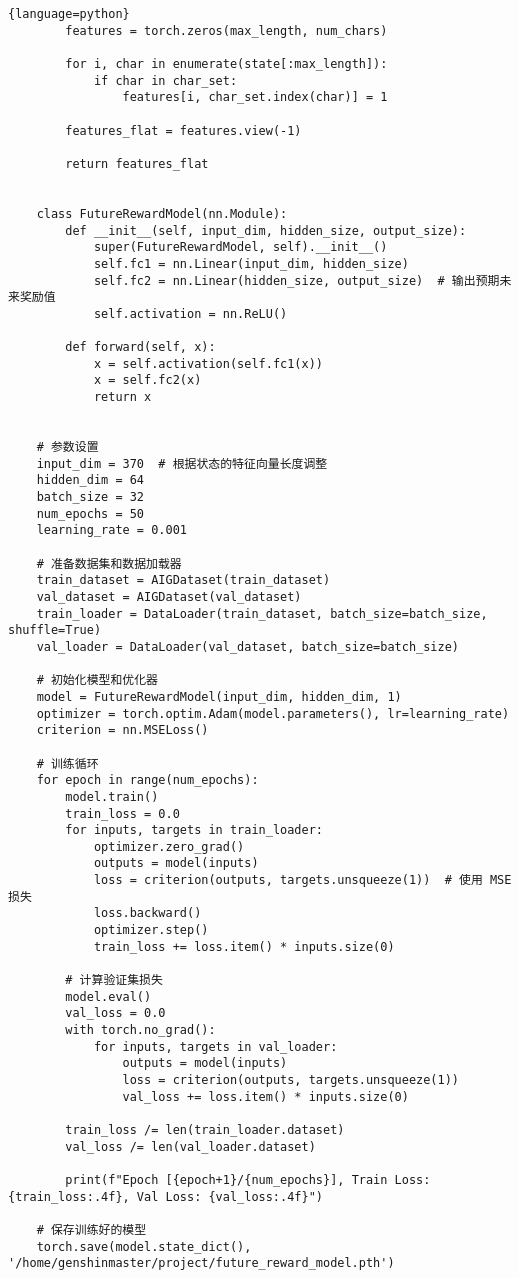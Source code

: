 \documentclass[UTF8]{ctexart}
\begin{document}
\begin{lstlisting}{language=python}
        features = torch.zeros(max_length, num_chars)
    
        for i, char in enumerate(state[:max_length]):
            if char in char_set:
                features[i, char_set.index(char)] = 1
    
        features_flat = features.view(-1)
    
        return features_flat
    
    
    class FutureRewardModel(nn.Module):
        def __init__(self, input_dim, hidden_size, output_size):
            super(FutureRewardModel, self).__init__()
            self.fc1 = nn.Linear(input_dim, hidden_size)
            self.fc2 = nn.Linear(hidden_size, output_size)  # 输出预期未来奖励值
            self.activation = nn.ReLU()
    
        def forward(self, x):
            x = self.activation(self.fc1(x))
            x = self.fc2(x)
            return x
    
    
    # 参数设置
    input_dim = 370  # 根据状态的特征向量长度调整
    hidden_dim = 64
    batch_size = 32
    num_epochs = 50
    learning_rate = 0.001
    
    # 准备数据集和数据加载器
    train_dataset = AIGDataset(train_dataset)
    val_dataset = AIGDataset(val_dataset)
    train_loader = DataLoader(train_dataset, batch_size=batch_size, shuffle=True)
    val_loader = DataLoader(val_dataset, batch_size=batch_size)
    
    # 初始化模型和优化器
    model = FutureRewardModel(input_dim, hidden_dim, 1)
    optimizer = torch.optim.Adam(model.parameters(), lr=learning_rate)
    criterion = nn.MSELoss()
    
    # 训练循环
    for epoch in range(num_epochs):
        model.train()
        train_loss = 0.0
        for inputs, targets in train_loader:
            optimizer.zero_grad()
            outputs = model(inputs)
            loss = criterion(outputs, targets.unsqueeze(1))  # 使用 MSE 损失
            loss.backward()
            optimizer.step()
            train_loss += loss.item() * inputs.size(0)
        
        # 计算验证集损失
        model.eval()
        val_loss = 0.0
        with torch.no_grad():
            for inputs, targets in val_loader:
                outputs = model(inputs)
                loss = criterion(outputs, targets.unsqueeze(1))
                val_loss += loss.item() * inputs.size(0)
        
        train_loss /= len(train_loader.dataset)
        val_loss /= len(val_loader.dataset)
        
        print(f"Epoch [{epoch+1}/{num_epochs}], Train Loss: {train_loss:.4f}, Val Loss: {val_loss:.4f}")
    
    # 保存训练好的模型
    torch.save(model.state_dict(), '/home/genshinmaster/project/future_reward_model.pth')
    
\end{lstlisting}
\end{document}
